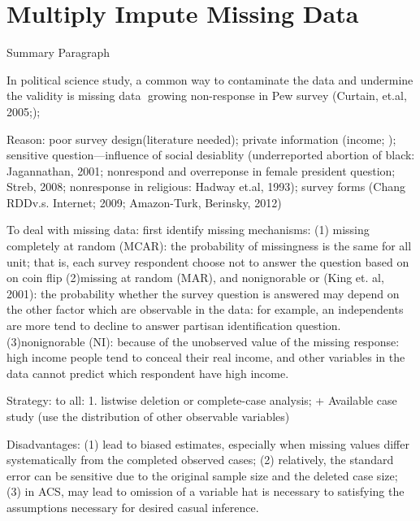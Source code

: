 
\section{Multiply Impute Missing Data}

Summary Paragraph\par

In political science study, a common way to contaminate the data and undermine the validity is missing data growing non-response in Pew survey (Curtain, et.al, 2005;);\par

Reason: poor survey design(literature needed); private information (income;  ); sensitive question—influence of social desiablity (underreported abortion of black: Jagannathan, 2001; nonrespond and overreponse in female president question; Streb, 2008; nonresponse in religious: Hadway et.al, 1993); survey forms (Chang RDDv.s. Internet; 2009; Amazon-Turk, Berinsky, 2012)\par

To deal with missing data: first identify missing mechanisms: (1) missing completely at random (MCAR): the probability of missingness is the same for all unit; that is, each survey respondent choose not to answer the question based on on coin flip (2)missing at random (MAR), and nonignorable or (King et. al, 2001): the probability whether the survey question is answered may depend on the other factor which are observable in the data: for example, an independents are more tend to decline to answer partisan identification question. (3)nonignorable (NI): because of the unobserved value of the missing response: high income people tend to conceal their real income, and other variables in the data cannot predict which respondent have high income.\par

Strategy: to all: 1. listwise deletion or complete-case analysis; +  Available case study  (use the distribution of other observable variables)\par

Disadvantages: (1) lead to biased estimates, especially when missing values differ systematically from the completed observed cases; (2) relatively, the standard error can be sensitive due to the original sample size and the deleted case size; (3) in ACS, may lead to omission of a variable hat is necessary to satisfying the assumptions necessary for desired casual inference.\par


